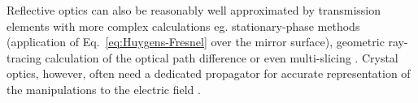 \documentclass{iucr}              %
\newcommand{\todo}[1]{{\color{red}[TODO: "#1'']}}
\begin{document}
Reflective optics can also be reasonably well approximated by transmission elements with more complex calculations eg. stationary-phase methods (application of Eq.~\ref{eq:Huygens-Fresnel} over the mirror surface), geometric ray-tracing calculation of the optical path difference \cite{Canestrari2014} or even multi-slicing \cite{Li2017}. Crystal optics, however, often need a dedicated propagator for accurate representation of the manipulations to the electric field \cite{Sutter2014, Sutter2020}.




\end{document}
